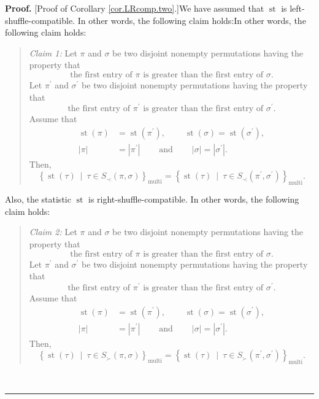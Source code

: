 \documentclass[numbers=enddot,12pt,final,onecolumn,notitlepage]{scrartcl}%
\theoremstyle{definition}
\newenvironment{statement}{\begin{quote}}{\end{quote}}
\newenvironment{proof}[1][Proof]{\noindent\textbf{#1.} }{\ \rule{0.5em}{0.5em}}
\begin{document}
\begin{proof}
[Proof of Corollary \ref{cor.LRcomp.two}.]We have assumed that
$\operatorname*{st}$ is left-shuffle-compatible. In other words, the following
claim holds:In other words, the following claim holds:

\begin{statement}
\textit{Claim 1:} Let $\pi$ and $\sigma$ be two disjoint nonempty permutations
having the property that%
\[
\text{the first entry of }\pi\text{ is greater than the first entry of }%
\sigma.
\]
Let $\pi^{\prime}$ and $\sigma^{\prime}$ be two disjoint nonempty permutations
having the property that%
\[
\text{the first entry of }\pi^{\prime}\text{ is greater than the first entry
of }\sigma^{\prime}.
\]
Assume that%
\begin{align*}
\operatorname*{st}\left(  \pi\right)   &  =\operatorname*{st}\left(
\pi^{\prime}\right)  ,\ \ \ \ \ \ \ \ \ \ \operatorname*{st}\left(
\sigma\right)  =\operatorname*{st}\left(  \sigma^{\prime}\right)  ,\\
\left\vert \pi\right\vert  &  =\left\vert \pi^{\prime}\right\vert
\ \ \ \ \ \ \ \ \ \ \text{and}\ \ \ \ \ \ \ \ \ \ \left\vert \sigma\right\vert
=\left\vert \sigma^{\prime}\right\vert .
\end{align*}
Then,
\[
\left\{  \operatorname*{st}\left(  \tau\right)  \ \mid\ \tau\in S_{\prec
}\left(  \pi,\sigma\right)  \right\}  _{\operatorname*{multi}}=\left\{
\operatorname*{st}\left(  \tau\right)  \ \mid\ \tau\in S_{\prec}\left(
\pi^{\prime},\sigma^{\prime}\right)  \right\}  _{\operatorname*{multi}}.
\]

\end{statement}

Also, the statistic $\operatorname*{st}$ is right-shuffle-compatible. In other
words, the following claim holds:

\begin{statement}
\textit{Claim 2:} Let $\pi$ and $\sigma$ be two disjoint nonempty permutations
having the property that%
\[
\text{the first entry of }\pi\text{ is greater than the first entry of }%
\sigma.
\]
Let $\pi^{\prime}$ and $\sigma^{\prime}$ be two disjoint nonempty permutations
having the property that%
\[
\text{the first entry of }\pi^{\prime}\text{ is greater than the first entry
of }\sigma^{\prime}.
\]
Assume that%
\begin{align*}
\operatorname*{st}\left(  \pi\right)   &  =\operatorname*{st}\left(
\pi^{\prime}\right)  ,\ \ \ \ \ \ \ \ \ \ \operatorname*{st}\left(
\sigma\right)  =\operatorname*{st}\left(  \sigma^{\prime}\right)  ,\\
\left\vert \pi\right\vert  &  =\left\vert \pi^{\prime}\right\vert
\ \ \ \ \ \ \ \ \ \ \text{and}\ \ \ \ \ \ \ \ \ \ \left\vert \sigma\right\vert
=\left\vert \sigma^{\prime}\right\vert .
\end{align*}
Then,
\[
\left\{  \operatorname*{st}\left(  \tau\right)  \ \mid\ \tau\in S_{\succ
}\left(  \pi,\sigma\right)  \right\}  _{\operatorname*{multi}}=\left\{
\operatorname*{st}\left(  \tau\right)  \ \mid\ \tau\in S_{\succ}\left(
\pi^{\prime},\sigma^{\prime}\right)  \right\}  _{\operatorname*{multi}}.
\]


\end{statement}
\end{proof}
\end{document}
